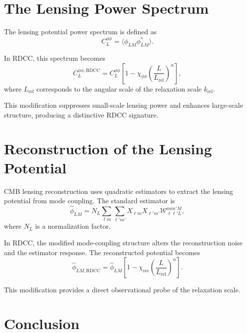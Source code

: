 \documentclass[11pt,a4paper]{article}
\begin{document}
\section{The Lensing Power Spectrum}

The lensing potential power spectrum is defined as
\begin{equation}
    C_{L}^{\phi\phi}
    = \langle \phi_{LM} \phi^{*}_{LM} \rangle.
\end{equation}

In RDCC, this spectrum becomes
\begin{equation}
    C_{L}^{\phi\phi,\mathrm{RDCC}}
    = C_{L}^{\phi\phi}
      \left[
        1 - \chi_{\phi\phi}
        \left(\frac{L}{L_{\mathrm{rel}}}\right)^{\alpha}
      \right],
\end{equation}
where $L_{\mathrm{rel}}$ corresponds to the angular scale of the relaxation scale 
$k_{\mathrm{rel}}$.

This modification suppresses small-scale lensing power and enhances large-scale 
structure, producing a distinctive RDCC signature.
\section{Reconstruction of the Lensing Potential}

CMB lensing reconstruction uses quadratic estimators to extract the lensing 
potential from mode coupling. The standard estimator is
\begin{equation}
    \hat{\phi}_{LM}
    = N_{L}
      \sum_{\ell m}
      \sum_{\ell' m'}
      X_{\ell m}
      X_{\ell' m'}
      \mathcal{W}_{\ell \ell' L}^{m m' M},
\end{equation}
where $N_{L}$ is a normalization factor.

In RDCC, the modified mode-coupling structure alters the reconstruction noise and 
the estimator response. The reconstructed potential becomes
\begin{equation}
    \hat{\phi}_{LM,\mathrm{RDCC}}
    = \hat{\phi}_{LM}
      \left[
        1 - \chi_{\mathrm{rec}}
        \left(\frac{L}{L_{\mathrm{rel}}}\right)^{\alpha}
      \right].
\end{equation}

This modification provides a direct observational probe of the relaxation scale.
\section{Conclusion}
\end{document}
